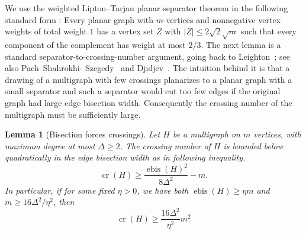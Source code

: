 \documentclass[11pt,a4paper]{amsart}
\newtheorem{lemma}[theorem]{Lemma}
\theoremstyle{definition}
\theoremstyle{remark}
\DeclareMathOperator{\crn}{cr}
\DeclareMathOperator{\bis}{ebis}
\begin{document}
We use the weighted Lipton--Tarjan planar separator theorem in the following standard form \cite[Theorem~4]{LiptonTarjan}: Every planar graph with $m$-vertices and nonnegative vertex weights of total weight $1$ has a vertex set $Z$ with $|Z|\le 2\sqrt{2}\sqrt m$ such that every component of the complement has weight at most $2/3$.  The next lemma is a standard separator-to-crossing-number argument, going back to Leighton~\cite[Theorem~7-1]{leighton1983complexity}; see also Pach--Shahrokhi- Szegedy~\cite[Theorem~2.1]{pach1994applications} and Djidjev~\cite{djidjev2001improved,djidjev2003crossing}.  The intuition behind it is that a drawing of a multigraph with few crossings planarizes to a planar graph with a small separator and such a separator would cut too few edges if the original graph had large edge bisection width.  Consequently the crossing number of the multigraph must be sufficiently large. 

\begin{lemma}[Bisection forces crossings]\label{lem:bisection-crossing}
Let $H$ be a multigraph on $m$ vertices, with maximum degree at most
$\Delta\ge 2$.  The crossing number of $H$ is bounded below quadratically in the edge bisection width as in following inequality.   
\begin{equation*}
        \crn(H)
        \ge
        \frac{\bis(H)^2}{8\Delta^2}-m.
\end{equation*}
In particular, if for some fixed $\eta > 0$, we have both $\bis(H)\ge \eta m$ and $m \geq 16\Delta^{2}/\eta^{2}$, then
\begin{equation*}
        \crn(H)\ge \frac{16\Delta^{2}}{\eta^{2}}m^2
\end{equation*}
\end{lemma}
\end{document}
